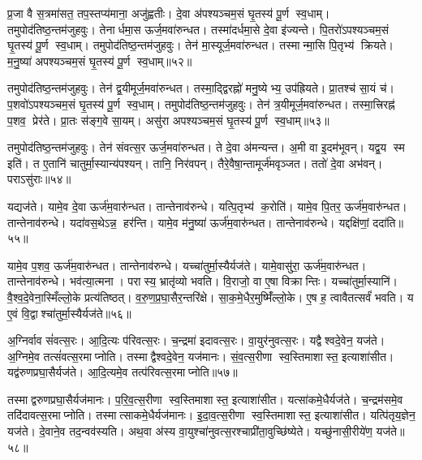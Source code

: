 प्र॒जा वै स॒त्रमा॑सत॒ तप॒स्तप्य॑माना॒ अजु॑ह्वतीः।
दे॒वा अ॑पश्यञ्चम॒सं घृ॒तस्य॑ पू॒र्ण स्व॒धाम्।
तमुपोद॑तिष्ठ॒न्तम॑\-जुहवुः।
तेनार्धमा॒स ऊर्ज॒मवा॑रुन्धत।
तस्मा॑दर्धमा॒से दे॒वा इ॑ज्यन्ते।
पि॒तरो॑ऽपश्यञ्चम॒सं घृ॒तस्य॑ पू॒र्ण स्व॒धाम्।
तमुपोद॑तिष्ठ॒न्तम॑जुहवुः।
तेन॑ मा॒स्यूर्ज॒मवा॑रुन्धत।
तस्मान्मा॒सि पि॒तृभ्य॑ क्रियते।
म॒नु॒ष्या॑ अपश्यञ्चम॒सं घृ॒तस्य॑ पू॒र्ण स्व॒धाम्॥५२॥

तमुपोद॑तिष्ठ॒न्तम॑जुहवुः।
तेन॑ द्व॒यीमूर्ज॒मवा॑रुन्धत।
तस्मा॒द्द्विरह्नो॑ मनु॒ष्येभ्य॒ उप॑ह्रियते।
प्रा॒तश्च॑ सा॒यं च॑।
प॒शवो॑ऽपश्यञ्चम॒सं घृ॒तस्य॑ पू॒र्ण स्व॒धाम्।
तमुपोद॑तिष्ठ॒न्त\-म॑जुहवुः।
तेन॑ त्र॒यीमूर्ज॒मवा॑रुन्धत।
तस्मा॒त्त्रिरह्न॑ प॒शव॒ प्रेर॑ते।
प्रा॒तः स॑ङ्ग॒वे सा॒यम्।
असु॑रा अपश्यञ्चम॒सं घृ॒तस्य॑ पू॒र्ण स्व॒धाम्॥५३॥

तमुपोद॑तिष्ठ॒न्तम॑जुहवुः।
तेन॑ संवत्स॒र ऊर्ज॒मवा॑रुन्धत।
ते दे॒वा अ॑मन्यन्त।
अ॒मी वा इ॒दम॑भूवन्।
यद्व॒य स्म इति॑।
त ए॒तानि॑ चातुर्मा॒स्यान्य॑पश्यन्।
तानि॒ निर॑वपन्।
तैरे॒वैषा॒न्तामूर्ज॑मवृञ्जत।
ततो॑ दे॒वा अभ॑वन्।
पराऽसु॑राः॥५४॥

यद्यज॑ते।
यामे॒व दे॒वा ऊर्ज॑म॒वारु॑न्धत।
तान्तेनाव॑रुन्धे।
यत्पि॒तृभ्य॑ क॒रोति॑।
यामे॒व पि॒तर॒ ऊर्ज॑म॒वारु॑न्धत।
तान्तेनाव॑रुन्धे।
यदा॑वस॒थेऽन्न॒ हर॑न्ति।
यामे॒व म॑नु॒ष्या॑ ऊर्ज॑म॒वारु॑न्धत।
तान्तेनाव॑रुन्धे।
यद्दक्षि॑णां॒ ददा॑ति॥५५॥

यामे॒व प॒शव॒ ऊर्ज॑म॒वारु॑न्धत।
तान्तेनाव॑रुन्धे।
यच्चा॑तुर्मा॒स्यैर्यज॑ते।
यामे॒वासु॑रा॒ ऊर्ज॑म॒वारु॑न्धत।
तान्तेनाव॑रुन्धे।
भव॑त्या॒त्मना।
परास्य॒ भ्रातृ॑व्यो भवति।
वि॒राजो॒ वा ए॒षा विक्रान्तिः।
यच्चा॑तुर्मा॒स्यानि॑।
वै॒श्व॒दे॒वेना॒स्मिँल्लो॒के प्रत्य॑तिष्ठत्।
व॒रु॒ण॒प्र॒घा॒सैर॒न्तरि॑क्षे।
सा॒क॒मे॒धैर॒मुष्मिँ॑ल्लो॒के।
ए॒ष ह॒ त्वावैतत्सर्वं॑ भवति।
य ए॒वं वि॒द्वाश्चा॑तुर्मा॒स्यैर्यज॑ते॥५६॥

अ॒ग्निर्वाव सं॑वत्स॒रः।
आ॒दि॒त्यः प॑रिवत्स॒रः।
च॒न्द्रमा॑ इदावत्स॒रः।
वा॒युर॑नुवत्स॒रः।
यद्वैश्वदे॒वेन॒ यज॑ते।
अ॒ग्निमे॒व तत्सं॑वत्स॒रमाप्नोति।
तस्माद्वैश्वदे॒वेन॒ यज॑मानः।
सं॒व॒त्स॒रीणा स्व॒स्तिमाशास्त॒ इत्याशा॑सीत।
यद्व॑रुण\-प्रघा॒सैर्यज॑ते।
आ॒दि॒त्यमे॒व तत्प॑रिवत्स॒रमाप्नोति॥५७॥

तस्माद्वरुणप्रघा॒सैर्यज॑मानः।
प॒रि॒व॒त्स॒रीणा स्व॒स्तिमा\-शास्त॒ इत्याशा॑सीत।
यत्सा॑कमे॒धैर्यज॑ते।
च॒न्द्रम॑समे॒व तदि॑दावत्स॒र\-माप्नोति।
तस्मात्साकमे॒धैर्यज॑मानः।
इ॒दा॒व॒त्स॒रीणा स्व॒स्तिमाशास्त॒ इत्याशा॑सीत।
यत्पि॑तृय॒ज्ञेन॒ यज॑ते।
दे॒वाने॒व तद॒न्वव॑स्यति।
अथ॒वा अ॑स्य वा॒युश्चा॑नुवत्स॒रश्चाप्री॑ता॒\-वुच्छि॑ष्येते।
यच्छु॑नासी॒रीये॑ण॒ यज॑ते॥५८॥

